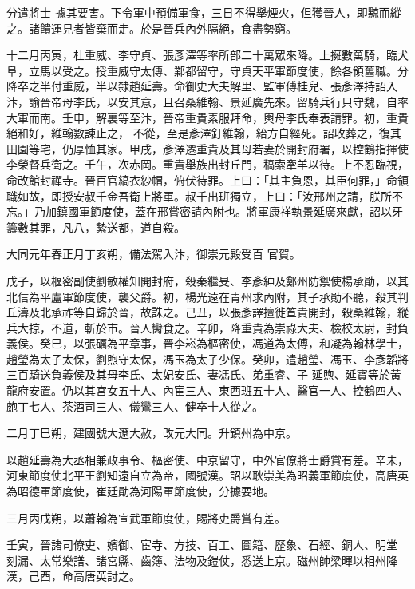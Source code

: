 \begin{pinyinscope}
 分遣將士
 據其要害。下令軍中預備軍食，三日不得舉煙火，但獲晉人，即黥而縱之。諸饋運見者皆棄而走。於是晉兵內外隔絕，食盡勢窮。



 十二月丙寅，杜重威、李守貞、張彥澤等率所部二十萬眾來降。上擁數萬騎，臨犬阜，立馬以受之。授重威守太傅、鄴都留守，守貞天平軍節度使，餘各領舊職。分降卒之半付重威，半以隸趙延壽。命御史大夫解里、監軍傅桂兒、張彥澤持詔入汴，諭晉帝母李氏，以安其意，且召桑維翰、景延廣先來。留騎兵行只守魏，自率大軍而南。壬申，解裏等至汴，晉帝重貴素服拜命，輿母李氏奉表請罪。初，重貴絕和好，維翰數諫止之，
 不從，至是彥澤釘維翰，紿方自經死。詔收葬之，復其田園等宅，仍厚恤其家。甲戌，彥澤遷重貴及其母若妻於開封府署，以控鶴指揮使李榮督兵衛之。壬午，次赤岡。重貴舉族出封丘門，稿索牽羊以待。上不忍臨視，命改館封禪寺。晉百官縞衣紗帽，俯伏待罪。上曰：「其主負恩，其臣何罪，」命領職如故，即授安叔千金吾衛上將軍。叔千出班獨立，上曰：「汝邢州之請，朕所不忘。」乃加鎮國軍節度使，蓋在邢嘗密請內附也。將軍康祥執景延廣來獻，詔以牙籌數其罪，凡八，縶送都，道自殺。



 大同元年春正月丁亥朔，備法駕入汴，御崇元殿受百
 官賀。



 戊子，以樞密副使劉敏權知開封府，殺秦繼旻、李彥紳及鄭州防禦使楊承勛，以其北信為平盧軍節度使，襲父爵。初，楊光遠在青州求內附，其子承勛不聽，殺其判丘濤及北承祚等自歸於晉，故誅之。己丑，以張彥譯擅徙笪貴開封，殺桑維翰，縱兵大掠，不道，斬於市。晉人臠食之。辛卯，降重貴為崇祿大夫、檢校太尉，封負義侯。癸巳，以張礪為平章事，晉李崧為樞密使，馮道為太傅，和凝為翰林學士，趙瑩為太子太保，劉煦守太保，馮玉為太子少保。癸卯，遣趙瑩、馮玉、李彥韜將三百騎送負義侯及其母李氏、太妃安氏、妻馮氏、弟重睿、子
 延煦、延寶等於黃龍府安置。仍以其宮女五十人、內宦三人、東西班五十人、醫官一人、控鶴四人、皰丁七人、茶酒司三人、儀鸞三人、健卒十人從之。



 二月丁巳朔，建國號大遼大赦，改元大同。升鎮州為中京。



 以趙延壽為大丞相兼政事令、樞密使、中京留守，中外官僚將士爵賞有差。辛未，河東節度使北平王劉知遠自立為帝，國號漢。詔以耿崇美為昭義軍節度使，高唐英為昭德軍節度使，崔廷勛為河陽軍節度使，分據要地。



 三月丙戌朔，以蕭翰為宣武軍節度使，賜將吏爵賞有差。



 壬寅，晉諸司僚吏、嬪御、宦寺、方技、百工、圖籍、歷象、石經、銅人、明堂
 刻漏、太常樂譜、諸宮縣、齒簿、法物及鎧仗，悉送上京。磁州帥梁暉以相州降漢，己酉，命高唐英討之。




\end{pinyinscope}
